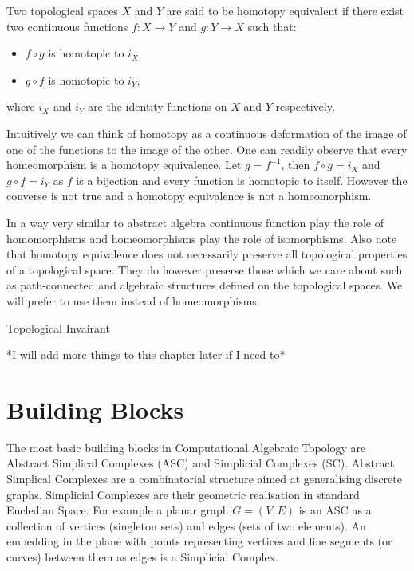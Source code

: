 \begin{defn} Two topological spaces $X$ and $Y$ are said to be homotopy equivalent if there exist two continuous functions $f: X \to Y$ and $g: Y \to X$ such that:  \end{defn}
\begin{itemize}
    \item $f \circ g$ is homotopic to $i_X$ 
    \item $g \circ f$ is homotopic to $i_Y$,
\end{itemize}

where $i_X$ and $i_Y$ are the identity functions on $X$ and $Y$ respectively.

Intuitively we can think of homotopy as a continuous deformation of the image of one of the functions to the image of the other. One can readily observe that every homeomorphism is a homotopy equivalence. Let $g = f^{-1}$, then $f \circ g = i_X$ and $g \circ f = i_Y$ as $f$ is a bijection and every function is homotopic to itself. However the converse is not true and a homotopy equivalence is not a homeomorphism.

In a way very similar to abstract algebra continuous function play the role of homomorphisms and homeomorphisms play the role of isomorphisms. Also note that homotopy equivalence does not necessarily preserve all topological properties of a topological space. They do however preserse those which we care about such as path-connected and algebraic structures defined on the topological spaces. We will prefer to use them instead of homeomorphisms. 


\begin{defn}{Topological Invairant}   \end{defn}

*I will add more things to this chapter later if I need to*


\section{Building Blocks}

The most basic building blocks in Computational Algebraic Topology are Abstract Simplical Complexes (ASC) and Simplicial Complexes (SC). Abstract Simplical Complexes are a combinatorial structure aimed at generalising discrete graphs. Simplicial Complexes are their geometric realisation in standard Eucledian Space. For example a planar graph $G = (V, E)$ is an ASC as a collection of vertices (singleton sets) and edges (sets of two elements). An embedding in the plane with points representing vertices and line segments (or curves) between them as edges is a Simplicial Complex.

